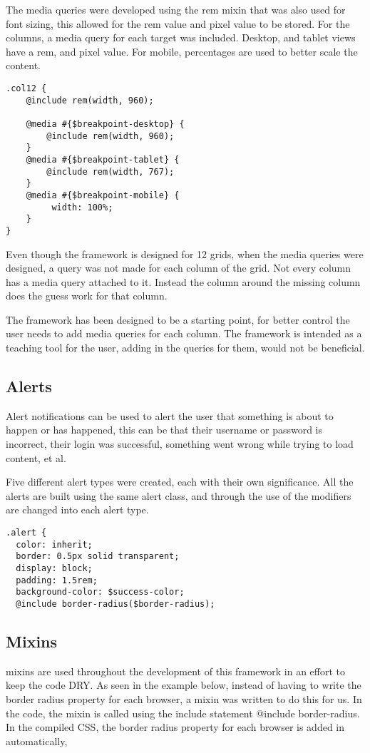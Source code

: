 The media queries were developed using the rem mixin that was also used for font sizing, this allowed for the rem value and pixel value to be stored. For the columns, a media query for each target was included. Desktop, and tablet views have a rem, and pixel value. For mobile, percentages are used to better scale the content.

\newpage
\begin{lstlisting}[language=CSS3]
.col12 {
	@include rem(width, 960);

	@media #{$breakpoint-desktop} {
		@include rem(width, 960);
	}
	@media #{$breakpoint-tablet} {
		@include rem(width, 767);
	}
	@media #{$breakpoint-mobile} {
		 width: 100%;
	}
}
\end{lstlisting}

Even though the framework is designed for 12 grids, when the media queries were designed, a query was not made for each column of the grid. Not every column has a media query attached to it. Instead the column around the missing column does the guess work for that column. 

The framework has been designed to be a starting point, for better control the user needs to add media queries for each column. The framework is intended as a teaching tool for the user, adding in the queries for them, would not be beneficial. 

\newpage
\subsection*{Alerts}
Alert notifications can be used to alert the user that something is about to happen or has happened, this can be that their username or password is incorrect, their login was successful, something went wrong while trying to load content, et al.

Five different alert types were created, each with their own significance. All the alerts are built using the same alert class, and through the use of the modifiers are changed into each alert type. 

\begin{lstlisting}[language=CSS3]
.alert {
  color: inherit;
  border: 0.5px solid transparent;
  display: block;
  padding: 1.5rem;
  background-color: $success-color;
  @include border-radius($border-radius);
\end{lstlisting}

\subsection*{Mixins}
\gls{mixins} are used throughout the development of this framework in an effort to keep the code DRY. As seen in the example below, instead of having to write the border radius property for each browser, a mixin was written to do this for us. In the code, the mixin is called using the include statement @include border-radius. In the compiled CSS, the border radius property for each browser is added in automatically, 

